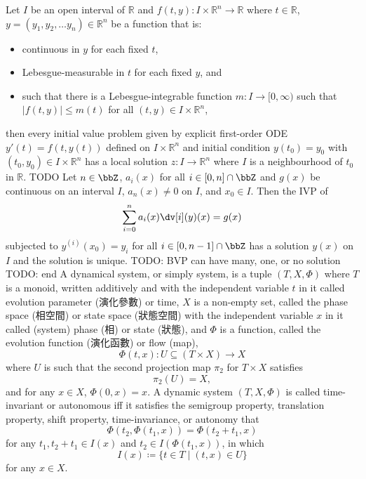 \documentclass[a4paper,12pt]{report}
\begin{document}
Let $I$ be an open interval of $\mathbb{R}$ and $f(t,y)\colon I\times\mathbb{R}^n\to\mathbb{R}$ where $t\in\mathbb{R}$, $y=(y_1, y_2,\dots  y_n)\in\mathbb{R}^n$ be a function that is:
\begin{itemize}
\item continuous in $y$ for each fixed $t$,
\item Lebesgue-measurable in $t$ for each fixed $y$, and
\item such that there is a Lebesgue-integrable function $m\colon I\to [0,\infty )$ such that $|f(t,y)|\leq m(t)$ for all $(t,y)\in I\times\mathbb{R}^n$,
\end{itemize}
then every initial value problem given by explicit first-order ODE $y'(t)=f\left(t,y(t)\right)$ defined on $I\times\mathbb{R}^n$ and initial condition $y\left(t_{0}\right)=y_{0}$ with $(t_{0},y_{0})\in I\times\mathbb{R}^n$ has a local solution $z\colon I\to \mathbb {R}^n$ where $I$ is a neighbourhood of $t_0$ in $\mathbb{R}$.
TODO
Let $n\in\bbZ$, $a_i(x)$ for all $i\in[0,n]\cap\bbZ$ and $g(x)$ be continuous on an interval $I$, $a_n(x)\ne0$ on $I$, and $x_0\in I$. Then the IVP of
\[\sum_{i=0}^na_i(x)\dv[i](y)(x)=g(x)\]
subjected to $y^{(i)}(x_0)=y_i$ for all $i\in[0,n-1]\cap\bbZ$ has a solution $y(x)$ on $I$ and the solution is unique.
TODO: BVP can have many, one, or no solution
TODO: end
A dynamical system, or simply system, is a tuple $(T, X, \Phi)$ where $T$ is a monoid, written additively and with the independent variable $t$ in it called evolution parameter (演化參數) or time, $X$ is a non-empty set, called the phase space (相空間) or state space (狀態空間) with the independent variable $x$ in it called (system) phase (相) or state (狀態), and $\Phi$ is a function, called the evolution function (演化函數) or flow (map),
\[\Phi(t,x)\colon U\subseteq(T\times X)\to X\]
where $U$ is such that the second projection map $\pi_2$ for $T\times X$ satisfies
\[\pi_2(U)=X,\]
and for any $x \in X$, $\Phi (0,x)=x$.
A dynamic system $(T, X, \Phi)$ is called time-invariant or autonomous iff it satisfies the semigroup property, translation property, shift property, time-invariance, or autonomy that
\[\Phi (t_{2},\Phi (t_{1},x))=\Phi (t_{2}+t_{1},x)\]
for any $t_{1},t_{2}+t_{1}\in I(x)$ and $t_{2}\in I(\Phi (t_{1},x))$, in which
\[I(x)\coloneq\{t\in T\mid(t,x)\in U\}\]
for any $x\in X$.
\end{document}
